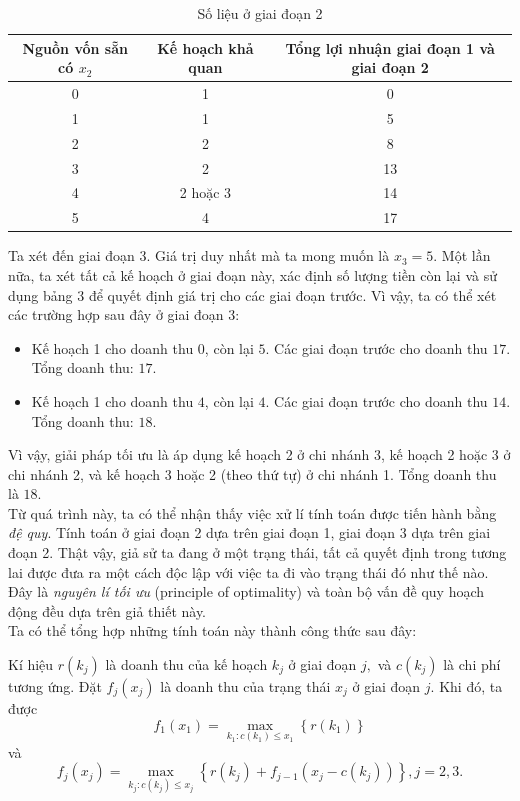 \documentclass[12pt,a4paper]{article}
\begin{document}
\begin{table}[H]
\begin{center}
\label{bang3}
\begin{tabular}{|c|c|c|}
\hline 
Nguồn vốn sẵn có \(x_2\) & Kế hoạch khả quan & Tổng lợi nhuận giai đoạn 1 và giai đoạn 2 \\ 
\hline 
0 & 1 & 0 \\ 
\hline 
1 & 1 & 5 \\ 
\hline 
2 & 2 & 8 \\ 
\hline 
3 & 2 & 13 \\ 
\hline 
4 & 2 hoặc 3 & 14 \\ 
\hline 
5 & 4 & 17 \\ 
\hline 
\end{tabular} 
\end{center}
\caption{Số liệu ở giai đoạn 2}
\end{table}
Ta xét đến giai đoạn 3. Giá trị duy nhất mà ta mong muốn là \(x_3 = 5.\) Một lần nữa, ta xét tất cả kế hoạch ở giai đoạn này, xác định số lượng tiền còn lại và sử dụng bảng 3 để quyết định giá trị cho các giai đoạn trước. Vì vậy, ta có thể xét các trường hợp sau đây ở giai đoạn 3:
\begin{itemize}
\item Kế hoạch 1 cho doanh thu \(0\), còn lại \(5.\) Các giai đoạn trước cho doanh thu \(17.\) Tổng doanh thu: \(17.\)
\item Kế hoạch 1 cho doanh thu \(4\), còn lại \(4.\) Các giai đoạn trước cho doanh thu \(14.\) Tổng doanh thu: \(18.\)
\end{itemize}
Vì vậy, giải pháp tối ưu là áp dụng kế hoạch 2 ở chi nhánh 3, kế hoạch 2 hoặc 3 ở chi nhánh 2, và kế hoạch 3 hoặc 2 (theo thứ tự) ở chi nhánh 1. Tổng doanh thu là \(18.\)\\
Từ quá trình này, ta có thể nhận thấy việc xử lí tính toán được tiến hành bằng \textit{đệ quy}. Tính toán ở giai đoạn 2 dựa trên giai đoạn 1, giai đoạn 3 dựa trên giai đoạn 2. Thật vậy, giả sử ta đang ở một trạng thái, tất cả quyết định trong tương lai được đưa ra một cách độc lập với việc ta đi vào trạng thái đó như thế nào. Đây là \textit{nguyên lí tối ưu} (principle of optimality) và toàn bộ vấn đề quy hoạch động đều dựa trên giả thiết này.\\
Ta có thể tổng hợp những tính toán này thành công thức sau đây:
\begin{center}
Kí hiệu \(r\left( {{k_j}} \right)\) là doanh thu của kế hoạch \({k_j}\) ở giai đoạn \(j,\) và \(c\left( {{k_j}} \right)\) là chi phí tương ứng. Đặt \({f_j}\left( {{x_j}} \right)\) là doanh thu của trạng thái \({x_j}\) ở giai đoạn \(j.\) Khi đó, ta được
\[{f_1}\left( {{x_1}} \right) = \mathop {\max }\limits_{{k_1}:c\left( {{k_1}} \right) \leqslant {x_1}} \left\{ {r\left( {{k_1}} \right)} \right\}\]
và 
\[{f_j}\left( {{x_j}} \right) = \mathop {\max }\limits_{{k_j}:c\left( {{k_j}} \right) \leqslant {x_j}} \left\{ {r\left( {{k_j}} \right) + {f_{j - 1}}\left( {{x_j} - c\left( {{k_j}} \right)} \right)} \right\},j = 2,3.\]
\end{center}
\end{document}
